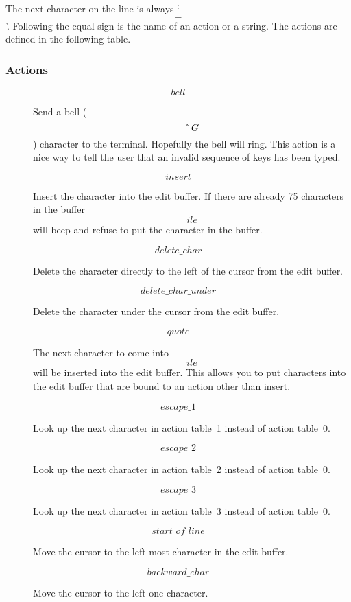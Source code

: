      The next character on the line is always `\[=\]'. Following  the
     equal sign is the name of an action or a string. The actions
     are defined in the following table.

\subsubsection{Actions}
\begin{description}
     \item[\[bell\]]		 Send a bell (\[\mbox{\^\,} G\]) character to the
     terminal.	 Hopefully the	 bell will ring.
			 This action is a nice way  to	tell  the
			 user  that  an	 invalid sequence of keys
			 has been typed.


     \item[\[insert\]]		  Insert  the  character  into	the  edit
			 buffer. If there are already 75 characters
     in the buffer \[ile\] will	beep and
			 refuse	 to put the character in the
			 buffer.


     \item[\[delete\_char\]]	  Delete the character	directly  to  the
			 left of the cursor from the edit buffer.


     \item[\[delete\_char\_under\]]	  Delete the character under  the  cursor
			 from the edit buffer.


     \item[\[quote\]]		  The next character  to  come	into  \[ile\]
			 will  be  inserted into the edit buffer.
			 This allows you to put	 characters  into
			 the  edit  buffer  that  are bound to an
			 action other than insert.


     \item[\[escape\_1\]]		  Look up the next  character  in  action
			 table~1 instead of action table~0.


     \item[\[escape\_2\]]		  Look up the next  character  in  action
			 table~2 instead of action table~0.


     \item[\[escape\_3\]]		  Look up the next  character  in  action
			 table~3 instead of action table~0.



     \item[\[start\_of\_line\]]	 Move the cursor to the left most character in
     the edit buffer.


     \item[\[backward\_char\]]	  Move the cursor to the left one character.



\end{description}
